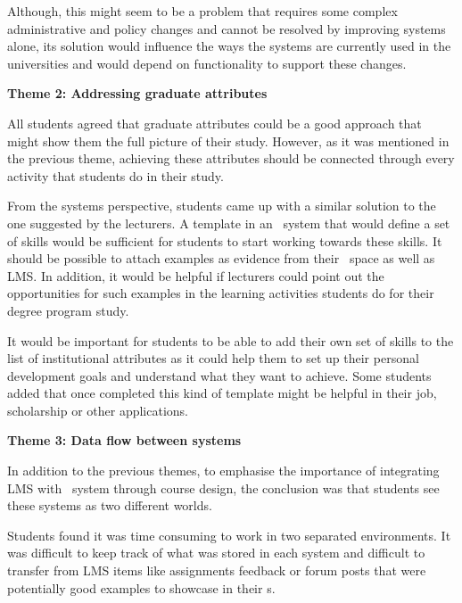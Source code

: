 Although, this might seem to be a problem that requires some complex
administrative and policy changes and cannot be resolved by improving systems
alone, its solution would influence the ways the systems are currently used in
the universities and would depend on functionality to support these changes.

\textbf{Theme 2: Addressing graduate attributes}

All students agreed that graduate attributes could be a good approach that might
show them the full picture of their study. However, as it was mentioned in the
previous theme, achieving these attributes should be connected through every
activity that students do in their study.


From the systems perspective, students came up with a similar solution to the
one suggested by the lecturers. A template in an \ep~system that would define a
set of \LLLs skills would be sufficient for students to start working towards
these skills. It should be possible to attach examples as evidence from their
\ep~space as well as LMS. In addition, it would be helpful if lecturers could
point out the opportunities for such examples in the learning activities
students do for their degree program study.

It would be important for students to be able to add their own set of skills to
the list of institutional attributes as it could help them to set up their
personal development goals and understand what they want to achieve. Some
students added that once completed this kind of template might be helpful in
their job, scholarship or other applications.

\textbf{Theme 3: Data flow between systems}

In addition to the previous themes, to emphasise the importance of integrating
LMS with \ep~system through course design, the conclusion was that students see
these systems as two different worlds.


Students found it was time consuming to work in two separated environments. It
was difficult to keep track of what was stored in each system and difficult to
transfer from LMS items like assignments feedback or forum posts that were
potentially good examples to showcase in their \ep s.

